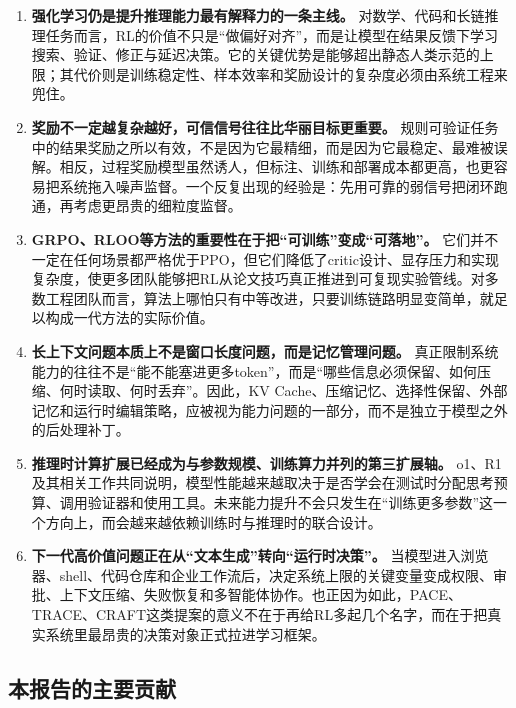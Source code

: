 \documentclass[12pt,a4paper]{article}
\begin{document}
\begin{enumerate}
    \item \textbf{强化学习仍是提升推理能力最有解释力的一条主线。} 对数学、代码和长链推理任务而言，RL的价值不只是“做偏好对齐”，而是让模型在结果反馈下学习搜索、验证、修正与延迟决策。它的关键优势是能够超出静态人类示范的上限；其代价则是训练稳定性、样本效率和奖励设计的复杂度必须由系统工程来兜住。
    
    \item \textbf{奖励不一定越复杂越好，可信信号往往比华丽目标更重要。} 规则可验证任务中的结果奖励之所以有效，不是因为它最精细，而是因为它最稳定、最难被误解。相反，过程奖励模型虽然诱人，但标注、训练和部署成本都更高，也更容易把系统拖入噪声监督。一个反复出现的经验是：先用可靠的弱信号把闭环跑通，再考虑更昂贵的细粒度监督。
    
    \item \textbf{GRPO、RLOO等方法的重要性在于把“可训练”变成“可落地”。} 它们并不一定在任何场景都严格优于PPO，但它们降低了critic设计、显存压力和实现复杂度，使更多团队能够把RL从论文技巧真正推进到可复现实验管线。对多数工程团队而言，算法上哪怕只有中等改进，只要训练链路明显变简单，就足以构成一代方法的实际价值。
    
    \item \textbf{长上下文问题本质上不是窗口长度问题，而是记忆管理问题。} 真正限制系统能力的往往不是“能不能塞进更多token”，而是“哪些信息必须保留、如何压缩、何时读取、何时丢弃”。因此，KV Cache、压缩记忆、选择性保留、外部记忆和运行时编辑策略，应被视为能力问题的一部分，而不是独立于模型之外的后处理补丁。
    
    \item \textbf{推理时计算扩展已经成为与参数规模、训练算力并列的第三扩展轴。} o1、R1及其相关工作共同说明，模型性能越来越取决于是否学会在测试时分配思考预算、调用验证器和使用工具。未来能力提升不会只发生在“训练更多参数”这一个方向上，而会越来越依赖训练时与推理时的联合设计。
    
    \item \textbf{下一代高价值问题正在从“文本生成”转向“运行时决策”。} 当模型进入浏览器、shell、代码仓库和企业工作流后，决定系统上限的关键变量变成权限、审批、上下文压缩、失败恢复和多智能体协作。也正因为如此，PACE、TRACE、CRAFT这类提案的意义不在于再给RL多起几个名字，而在于把真实系统里最昂贵的决策对象正式拉进学习框架。
\end{enumerate}

\subsection{本报告的主要贡献}
\end{document}
